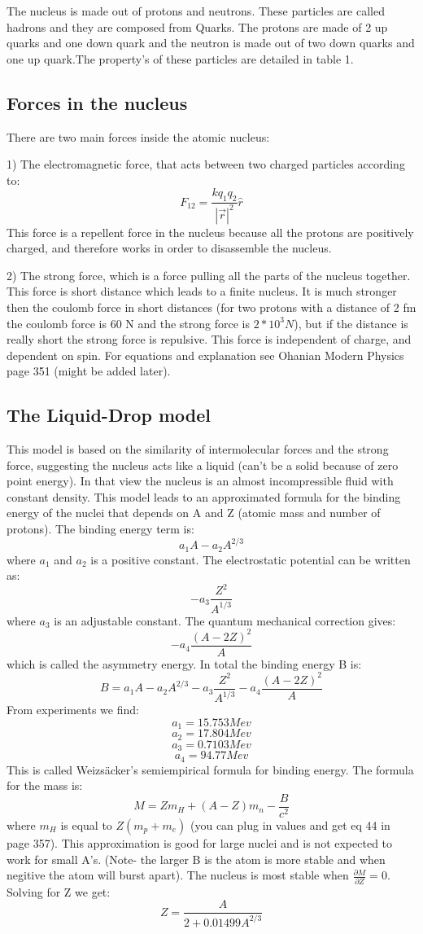 \documentclass[]{article}
\begin{document}
The nucleus is made out of protons and neutrons. These particles are called hadrons and they are composed from Quarks. The protons are made of 2 up quarks and one down quark and the neutron is made out of two down quarks and one up quark.The property's of these particles are detailed in table 1.


\subsection{Forces in the nucleus}

There are two main forces inside the atomic nucleus:

1) The electromagnetic force, that acts between two charged particles according to: $$F_{12}=\frac{kq_1q_2}{|\vec{r}|^2}\hat{r}$$ This force is a repellent force in the nucleus because all the protons are positively charged, and therefore works in order to disassemble the nucleus.

2) The strong force, which is a force pulling all the parts of the nucleus together. This force is short distance which leads to a finite nucleus. It is much stronger then the coulomb force in short distances (for two protons with a distance of 2 fm the coulomb force is 60 N and the strong force is $2*10^{3} N$), but if the distance is really short the strong force is repulsive. This force is independent of charge, and dependent on spin. For equations and explanation see Ohanian Modern Physics page 351 (might be added later).

\subsection{The Liquid-Drop model}

This model is based on the similarity of intermolecular forces and the strong force, suggesting the nucleus acts like a liquid (can't be a solid because of zero point energy). In that view the nucleus is an almost incompressible fluid with constant density. This model leads to an approximated formula for the binding energy of the nuclei that depends on A and Z (atomic mass and number of protons). The binding energy term is: $$a_1A-a_2A^{2/3}$$ where $a_1$ and $a_2$ is a positive constant. The electrostatic potential can be written as: $$-a_3\frac{Z^2}{A^{1/3}}$$ where $a_3$ is an adjustable constant. The quantum mechanical correction gives: $$-a_4\frac{(A-2Z)^2}{A}$$ which is called the asymmetry energy. In total the binding energy B is: $$B=a_1A-a_2A^{2/3}-a_3\frac{Z^2}{A^{1/3}}-a_4\frac{(A-2Z)^2}{A}$$ From experiments we find: $$a_1=15.753Mev$$ $$a_2=17.804Mev$$ $$a_3=0.7103Mev$$ $$a_4=94.77Mev$$ This is called Weizs\"acker's semiempirical formula for binding energy. The formula for the mass is: $$M=Zm_H+(A-Z)m_n-\frac{B}{c^2}$$ where $m_H$ is equal to $Z(m_p+m_e)$ (you can plug in values and get eq 44 in page 357).
This approximation is good for large nuclei and is not expected to work for small A's. (Note- the larger B is the atom is more stable and when negitive the atom will burst apart). The nucleus is most stable when $\frac{\partial M}{\partial Z}=0$. Solving for Z we get: $$Z=\frac{A}{2+0.01499A^{2/3}}$$
\end{document}
